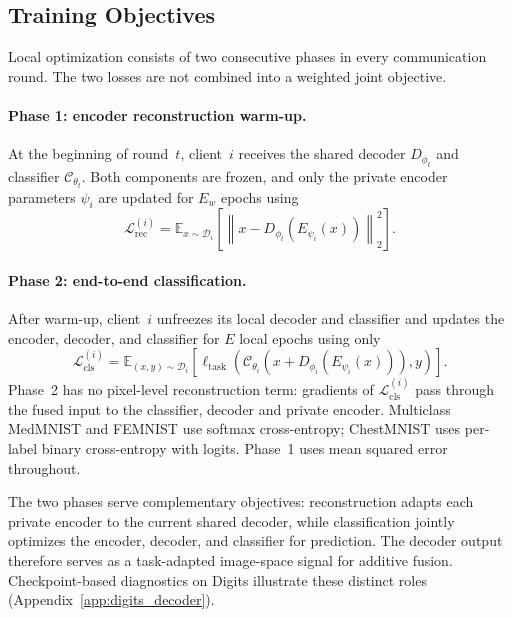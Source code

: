 \documentclass[twoside]{article}
\newcommand{\coauthorcolor}{}
\newenvironment{coauthorrevision}{\par\begingroup\coauthorcolor}{\par\endgroup}
\theoremstyle{thmstyleone}%
\theoremstyle{thmstyletwo}%
\theoremstyle{thmstylethree}%
\begin{document}
\subsection{Training Objectives}\label{sec:training_obj}

Local optimization consists of two consecutive phases in every communication
round. The two losses are not combined into a weighted joint objective.

\paragraph{Phase 1: encoder reconstruction warm-up.}
At the beginning of round~$t$, client~$i$ receives the shared decoder
$D_{\phi_t}$ and classifier $\mathcal{C}_{\theta_t}$. Both components are
frozen, and only the private encoder parameters $\psi_i$ are updated for
$E_w$ epochs using
\begin{equation*}
\mathcal{L}_{\mathrm{rec}}^{(i)}
=
\mathbb{E}_{x\sim\mathcal{D}_i}
\left[
\left\|
x-D_{\phi_t}\!\left(E_{\psi_i}(x)\right)
\right\|_2^2
\right].
\end{equation*}

\paragraph{Phase 2: end-to-end classification.}
After warm-up, client~$i$ unfreezes its local decoder and classifier and updates
the encoder, decoder, and classifier for $E$ local epochs using only
\begin{equation*}
\mathcal{L}_{\mathrm{cls}}^{(i)}
=
\mathbb{E}_{(x,y)\sim\mathcal{D}_i}
\left[
\ell_{\mathrm{task}}
\left(
\mathcal{C}_{\theta_i}
\left(
x+D_{\phi_i}\!\left(E_{\psi_i}(x)\right)
\right),
y
\right)
\right].
\end{equation*}
Phase~2 has no pixel-level reconstruction term: gradients of
$\mathcal{L}_{\mathrm{cls}}^{(i)}$ pass through the fused input to the
classifier, decoder and private encoder. Multiclass MedMNIST and FEMNIST use
softmax cross-entropy; ChestMNIST uses per-label binary cross-entropy with
logits. Phase~1 uses mean squared error throughout.

\begin{coauthorrevision}
The two phases serve complementary objectives: reconstruction adapts each
private encoder to the current shared decoder, while classification jointly
optimizes the encoder, decoder, and classifier for prediction. The decoder
output therefore serves as a task-adapted image-space signal for additive
fusion. Checkpoint-based diagnostics on Digits illustrate these distinct
roles (Appendix~\ref{app:digits_decoder}).
\end{coauthorrevision}
\end{document}

